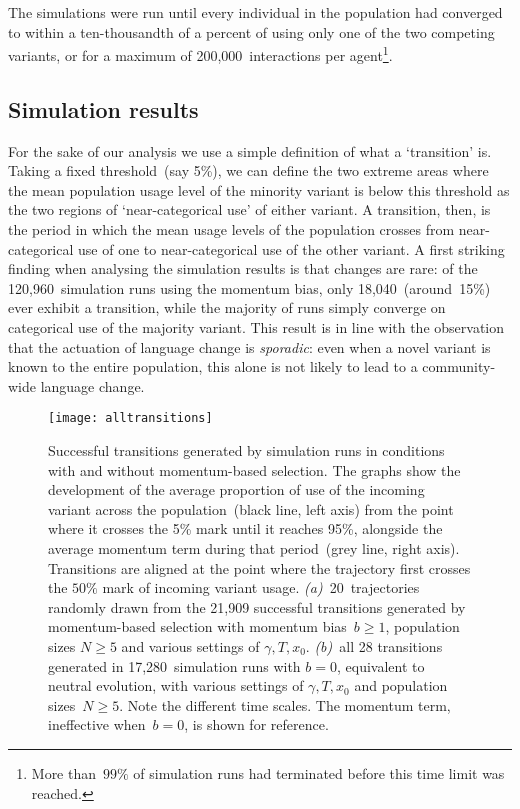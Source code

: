 The simulations were run until every individual in the population had converged to within a ten-thousandth of a percent of using only one of the two competing variants, or for a maximum of 200,000~interactions per agent\footnote{More than~$99\%$ of simulation runs had terminated before this time limit was reached.}.

\subsection{Simulation results}

For the sake of our analysis we use a simple definition of what a `transition' is. Taking a fixed threshold~(say 5\%), we can define the two extreme areas where the mean population usage level of the minority variant is below this threshold as the two regions of `near-categorical use' of either variant. A transition, then, is the period in which the mean usage levels of the population crosses from near-categorical use of one to near-categorical use of the other variant. A first striking finding when analysing the simulation results is that changes are rare: of the 120,960~simulation runs using the momentum bias, only 18,040~(around~15\%) ever exhibit a transition, while the majority of runs simply converge on categorical use of the majority variant. This result is in line with the observation that the actuation of language change is \emph{sporadic}: even when a novel variant is known to the entire population, this alone is not likely to lead to a community-wide language change.

\begin{figure}
\centering
\texttt{[image: alltransitions]}
\caption[Successful transitions generated by simulation runs in conditions with and without the momentum-based selection bias]{Successful transitions generated by simulation runs in conditions with and without momentum-based selection. The graphs show the development of the average proportion of use of the incoming variant across the population~(black line, left axis) from the point where it crosses the 5\% mark until it reaches 95\%, alongside the average momentum term during that period~(grey line, right axis). Transitions are aligned at the point where the trajectory first crosses the $50\%$ mark of incoming variant usage. \textit{(a)}~20~trajectories randomly drawn from the 21,909 successful transitions generated by momentum-based selection with momentum bias~$b\ge1$, population sizes $N\ge5$ and various settings of $\gamma, T, x_0$. %
\textit{(b)}~all 28 transitions generated in 17,280~simulation runs with $b=0$, equivalent to neutral evolution, with various settings of $\gamma, T, x_0$ and population sizes~$N\ge5$. %
Note the different time scales. The momentum term, ineffective when~$b=0$, is shown for reference.}
\label{fig:alltransitions}
\end{figure}

